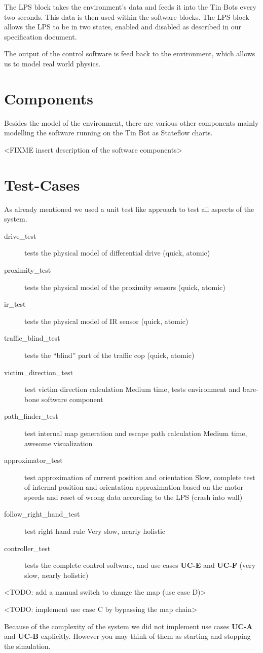 \documentclass[a4paper,parskip,headheight=38pt]{scrartcl} %
\begin{document}
The LPS block takes the environment's data and feeds it into the Tin Bots every two seconds. This data is then used within the software blocks. The LPS block allows the LPS to be in two states, enabled and disabled as described in our specification document.

The output of the control software is feed back to the environment, which allows us to model real world physics.

\section{Components}
Besides the model of the environment, there are various other components mainly modelling the software running on the Tin Bot as Stateflow charts.

<FIXME insert description of the software components>

\section{Test-Cases}
As already mentioned we used a unit test like approach to test all aspects of the system.

\begin{description}
\item[drive\_test] tests the physical model of differential drive (quick, atomic)
\item[proximity\_test] tests the physical model of the proximity sensors (quick, atomic)
\item[ir\_test] tests the physical model of IR sensor (quick, atomic)
\item[traffic\_blind\_test] tests the \enquote{blind} part of the traffic cop (quick, atomic)
\item[victim\_direction\_test] test victim direction calculation
    Medium time, tests environment and bare-bone software component
\item[path\_finder\_test] test internal map generation and escape path calculation
    Medium time, awesome visualization
\item[approximator\_test] test approximation of current position and orientation
    Slow, complete test of internal position and orientation approximation based on the
    motor speeds and reset of wrong data according to the LPS (crash into wall)
\item[follow\_right\_hand\_test] test right hand rule
    Very slow, nearly holistic
\item[controller\_test] tests the complete control software, and use cases \textbf{UC-E} and \textbf{UC-F} (very slow, nearly holistic)
\end{description}

<TODO: add a manual switch to change the map (use case D)>

<TODO: implement use case C by bypassing the map chain>

Because of the complexity of the system we did not implement use cases \textbf{UC-A} and \textbf{UC-B} explicitly. However you may think of them as starting and stopping the simulation.
\end{document}
